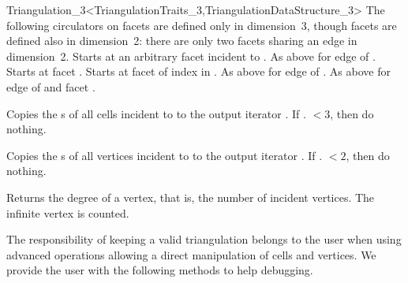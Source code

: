 \begin{ccRefClass}{Triangulation_3<TriangulationTraits_3,TriangulationDataStructure_3>}
The following circulators on facets are defined only in dimension~3,
though facets are defined also in dimension~2: there are only two
facets sharing an edge in dimension~2. 
{Starts at an arbitrary facet incident to .
}
\ccGlue
{}
{As above for edge  of .} 
\ccGlue
{}
{Starts at facet . 
}
\ccGlue
{}
{Starts at facet of index  in .}
\ccGlue
{} 
{As above for edge  of .} 
\ccGlue
{}
{As above for edge  of  and facet .} 


{Copies the s of all cells incident to  to the output
iterator .  If \ccVar. $<3$, then do nothing.
}

{Copies the s of all vertices incident to  to the
output iterator .  If \ccVar. $<2$, then do
nothing.  }

{Returns the degree of a vertex, that is, the number of incident vertices.
The infinite vertex is counted.
}

\begin{ccAdvanced}
The responsibility of keeping a valid triangulation belongs to the user
when using advanced operations allowing a direct manipulation of cells
and vertices. We provide the user with the following methods to help
debugging. 


\end{ccAdvanced}
\end{ccRefClass}

